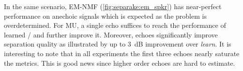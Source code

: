 \mynewline
In the same scenario, \ac{EM}-\ac{NMF} (\cref{fig:separake:em_spkr}) has near-perfect performance on anechoic signals which is expected as the problem is overdetermined.
For \ac{MU}, a single echo suffices to reach the performance of learned \RTFs/ and further improve it.
Moreover, echoes significantly improve separation quality as illustrated by up to 3~dB improvement over \textit{learn}.
It is interesting to note that in all experiments the first three echoes nearly saturate the metrics.
This is good news since higher order echoes are hard to estimate.

